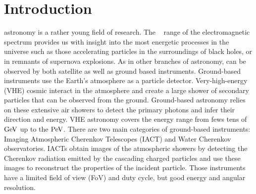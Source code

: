 \documentclass[traditabstract, longauth]{aa}
\begin{document}
\maketitle

\section{Introduction}
\label{sec:introduction}


\gammaray astronomy is a rather young field of research. The \gammaray~
range of the electromagnetic spectrum provides us with insight into the
most energetic processes in the universe such as those accelerating particles in the surroundings of
black holes, or in remnants of supernova explosions. As in other
branches of astronomy, \gammarays can be observed by both
satellite as well as ground based instruments.
Ground-based instruments use the Earth's atmosphere as a particle detector.
Very-high-energy (VHE) cosmic \gammarays interact in the atmosphere and
create a large shower of secondary particles that can be observed from the ground.
Ground-based \gammaray astronomy relies on these extensive air showers to detect the
primary \gammaray photons and infer their direction and energy.
VHE \gammaray astronomy covers the energy range from fews tens of ${\rm GeV}$ up to the ${\rm PeV}$.
There are two main categories of ground-based instruments: 
Imaging Atmospheric Cherenkov Telescopes (IACT) and 
Water Cherenkov observatories. IACTs obtain images of the atmospheric showers
by detecting the Cherenkov radiation emitted by the cascading charged particles and
use these images to reconstruct the properties of the incident particle.
Those instruments have a limited field of view (FoV) and duty cycle, but
good energy and angular resolution.
\end{document}
